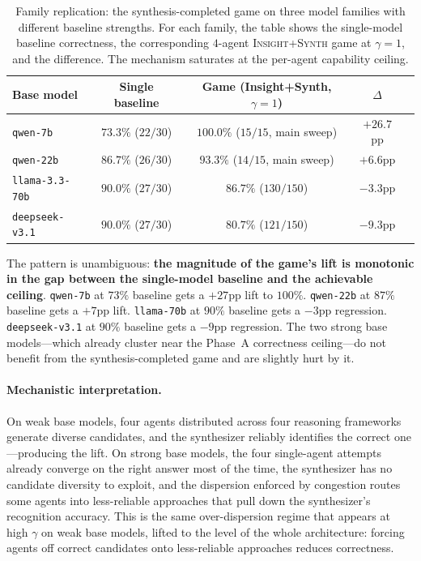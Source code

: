 \documentclass[11pt]{amsart}
\newcommand{\g}{\gamma}
\newcommand\1{{\mathds{1}}}
\theoremstyle{definition}
\theoremstyle{remark}
\numberwithin{equation}{section}
\begin{document}
\begin{table}[h]
\centering\small
\caption{Family replication: the synthesis-completed game on three model families with different baseline strengths. For each family, the table shows the single-model baseline correctness, the corresponding $4$-agent \textsc{Insight+Synth} game at $\g\!=\!1$, and the difference. The mechanism saturates at the per-agent capability ceiling.}
\label{tab:ceiling}
\begin{tabular}{lcccc}
\toprule
Base model & Single baseline & Game (Insight+Synth, $\g\!=\!1$) & $\Delta$ \\
\midrule
\texttt{qwen-7b}        & $73.3\%$ ($22/30$) & $\mathbf{100.0\%}$ ($15/15$, main sweep) & $\mathbf{+26.7}$pp \\
\texttt{qwen-22b}       & $86.7\%$ ($26/30$) & $93.3\%$ ($14/15$, main sweep)           & $+6.6$pp \\
\texttt{llama-3.3-70b}  & $90.0\%$ ($27/30$) & $86.7\%$ ($130/150$)                     & $-3.3$pp \\
\texttt{deepseek-v3.1}  & $90.0\%$ ($27/30$) & $80.7\%$ ($121/150$)                     & $-9.3$pp \\
\bottomrule
\end{tabular}
\end{table}

The pattern is unambiguous: \textbf{the magnitude of the game's lift is monotonic in the gap between the single-model baseline and the achievable ceiling}.
\texttt{qwen-7b} at $73\%$ baseline gets a $+27$pp lift to $100\%$.
\texttt{qwen-22b} at $87\%$ baseline gets a $+7$pp lift.
\texttt{llama-70b} at $90\%$ baseline gets a $-3$pp regression.
\texttt{deepseek-v3.1} at $90\%$ baseline gets a $-9$pp regression.
The two strong base models---which already cluster near the Phase~A correctness ceiling---do not benefit from the synthesis-completed game and are slightly hurt by it.

\paragraph{Mechanistic interpretation.}
On weak base models, four agents distributed across four reasoning frameworks generate diverse candidates, and the synthesizer reliably identifies the correct one---producing the lift.
On strong base models, the four single-agent attempts already converge on the right answer most of the time, the synthesizer has no candidate diversity to exploit, and the dispersion enforced by congestion routes some agents into less-reliable approaches that pull down the synthesizer's recognition accuracy.
This is the same over-dispersion regime that appears at high $\g$ on weak base models, lifted to the level of the whole architecture: forcing agents off correct candidates onto less-reliable approaches reduces correctness.
\end{document}
